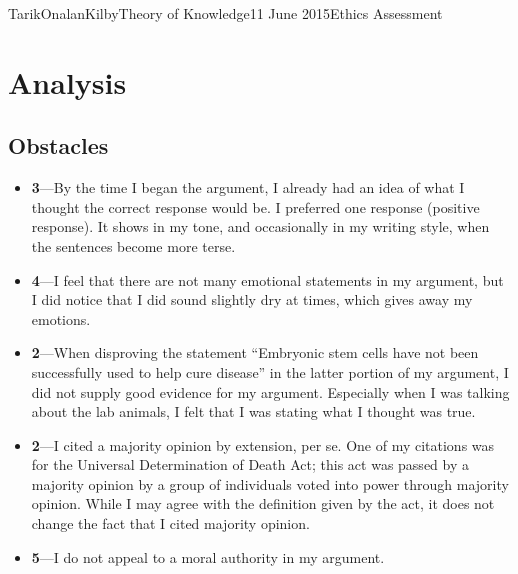 \documentclass[a4paper,12pt]{article}
\begin{document}
\begin{mla}{Tarik}{Onalan}{Kilby}{Theory of Knowledge}{11 June 2015}{Ethics Assessment}
        \section{Analysis}
            \subsection{Obstacles}
                \begin{itemize}
                    \item \textbf{3}---By the time I began the argument, I already had an idea of what I
                        thought the correct response would be. I preferred one response (positive response).
                        It shows in my tone, and occasionally in my writing style, when the sentences become
                        more terse.
                    \item \textbf{4}---I feel that there are not many emotional statements in my argument,
                        but I did notice that I did sound slightly dry at times, which gives away my emotions.
                    \item \textbf{2}---When disproving the statement ``Embryonic stem cells have not been
                        successfully used to help cure disease'' in the latter portion of my argument, I
                        did not supply good evidence for my argument. Especially when I was talking about
                        the lab animals, I felt that I was stating what I thought was true.
                    \item \textbf{2}---I cited a majority opinion by extension, per se. One of my citations
                        was for the Universal Determination of Death Act; this act was passed by a majority
                        opinion by a group of individuals voted into power through majority opinion. While
                        I may agree with the definition given by the act, it does not change the fact that
                        I cited majority opinion.
                    \item \textbf{5}---I do not appeal to a moral authority in my argument.
                \end{itemize}

\end{mla}
\end{document}
